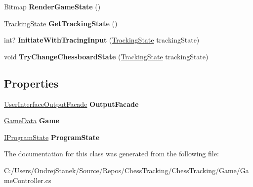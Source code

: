 \begin{DoxyCompactItemize}
Bitmap {\bfseries Render\+Game\+State} ()
\item 
\mbox{\label{class_chess_tracking_1_1_game_1_1_game_controller_a5e41ed90b56e9f47c5a9db0bc0ba3dc4}} 
\mbox{\hyperlink{class_chess_tracking_1_1_multithreading_messages_1_1_tracking_state}{Tracking\+State}} {\bfseries Get\+Tracking\+State} ()
\item 
\mbox{\label{class_chess_tracking_1_1_game_1_1_game_controller_ad7a219154e29ca05196be6c414c220b5}} 
int? {\bfseries Initiate\+With\+Tracing\+Input} (\mbox{\hyperlink{class_chess_tracking_1_1_multithreading_messages_1_1_tracking_state}{Tracking\+State}} tracking\+State)
\item 
\mbox{\label{class_chess_tracking_1_1_game_1_1_game_controller_a489b5f38fd577011b615bf55c27e9386}} 
void {\bfseries Try\+Change\+Chessboard\+State} (\mbox{\hyperlink{class_chess_tracking_1_1_multithreading_messages_1_1_tracking_state}{Tracking\+State}} tracking\+State)
\end{DoxyCompactItemize}
\subsection*{Properties}
\begin{DoxyCompactItemize}
\item 
\mbox{\label{class_chess_tracking_1_1_game_1_1_game_controller_a835b7900b521bd9d53374085f1916a90}} 
\mbox{\hyperlink{class_chess_tracking_1_1_user_interface_1_1_user_interface_output_facade}{User\+Interface\+Output\+Facade}} {\bfseries Output\+Facade}
\item 
\mbox{\label{class_chess_tracking_1_1_game_1_1_game_controller_a9ef6a12b0d4f2b6ade13be74c4130120}} 
\mbox{\hyperlink{class_chess_tracking_1_1_game_1_1_game_data}{Game\+Data}} {\bfseries Game}
\item 
\mbox{\label{class_chess_tracking_1_1_game_1_1_game_controller_a81dbcfa4556f8ca41b351a9238ac6ea2}} 
\mbox{\hyperlink{interface_chess_tracking_1_1_controlling_elements_1_1_program_state_1_1_i_program_state}{I\+Program\+State}} {\bfseries Program\+State}
\end{DoxyCompactItemize}


The documentation for this class was generated from the following file\+:\begin{DoxyCompactItemize}
\item 
C\+:/\+Users/\+Ondrej\+Stanek/\+Source/\+Repos/\+Chess\+Tracking/\+Chess\+Tracking/\+Game/Game\+Controller.\+cs\end{DoxyCompactItemize}
